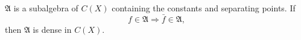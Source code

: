 
$\mathfrak{A}$ is a subalgebra of $C(X)$ containing the constants and separating points. If
$$f \in \mathfrak{A} \Rightarrow \bar{f} \in \mathfrak{A},$$
then $\mathfrak{A}$ is dense in $C(X)$.
